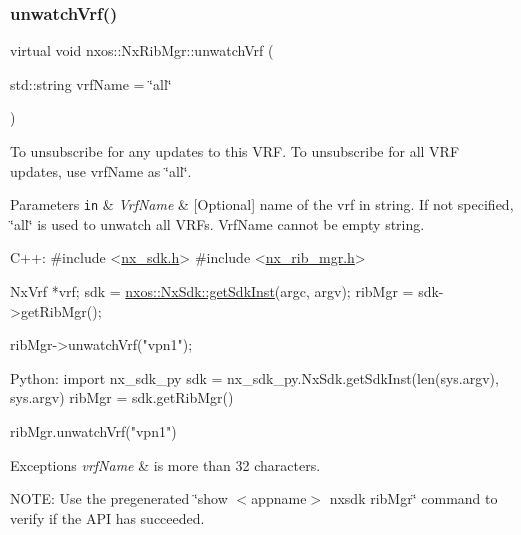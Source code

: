 \subsubsection{\texorpdfstring{unwatch\+Vrf()}{unwatchVrf()}}
{\footnotesize\ttfamily virtual void nxos\+::\+Nx\+Rib\+Mgr\+::unwatch\+Vrf (\begin{DoxyParamCaption}\item[{std\+::string}]{vrf\+Name = {\ttfamily \char`\"{}all\char`\"{}} }\end{DoxyParamCaption})\hspace{0.3cm}{\ttfamily [pure virtual]}}

To unsubscribe for any updates to this V\+RF. To unsubscribe for all V\+RF updates, use vrf\+Name as \char`\"{}all\char`\"{}. 
\begin{DoxyParams}[1]{Parameters}
\mbox{\tt in}  & {\em Vrf\+Name} & \mbox{[}Optional\mbox{]} name of the vrf in string. If not specified, \char`\"{}all\char`\"{} is used to unwatch all V\+R\+Fs. Vrf\+Name cannot be empty string.\\
\hline
\end{DoxyParams}

\begin{DoxyCode}
C++:
\textcolor{preprocessor}{     #include <\mbox{\hyperlink{nx__sdk_8h}{nx\_sdk.h}}>}
\textcolor{preprocessor}{     #include <\mbox{\hyperlink{nx__rib__mgr_8h}{nx\_rib\_mgr.h}}>}

     NxVrf *vrf;
     sdk = \mbox{\hyperlink{classnxos_1_1_nx_sdk_a5050e2d26c40744b4fc7862068a83f39}{nxos::NxSdk::getSdkInst}}(argc, argv);
     ribMgr = sdk->getRibMgr();

     ribMgr->unwatchVrf(\textcolor{stringliteral}{"vpn1"});

Python:
     \textcolor{keyword}{import} nx\_sdk\_py
     sdk = nx\_sdk\_py.NxSdk.getSdkInst(len(sys.argv), sys.argv)
     ribMgr = sdk.getRibMgr()

     ribMgr.unwatchVrf(\textcolor{stringliteral}{"vpn1"})
\end{DoxyCode}



\begin{DoxyExceptions}{Exceptions}
{\em vrf\+Name} & is more than 32 characters.\\
\hline
\end{DoxyExceptions}
N\+O\+TE\+: Use the pregenerated \char`\"{}show $<$appname$>$ nxsdk rib\+Mgr\char`\"{} command to verify if the A\+PI has succeeded. \mbox{\label{classnxos_1_1_nx_rib_mgr_ab6749ea02f53fc8b2f6cdba21bbc335d}} 
